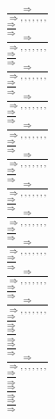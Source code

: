 \documentclass[11pt]{article}
\begin{document}
\begin{center}
\bigskip
\\$\frac{\Rightarrow }{\Rightarrow , , , , , , , }$
\bigskip
\\$\frac{\Rightarrow }{\Rightarrow }$
\bigskip
\\$\frac{\Rightarrow }{\Rightarrow , , , , , , , }$
\bigskip
\\$\frac{\Rightarrow }{\Rightarrow }$
\bigskip
\\$\frac{\Rightarrow }{\Rightarrow , , , , , , , }$
\bigskip
\\$\frac{\Rightarrow }{\Rightarrow }$
\bigskip
\\$\frac{\Rightarrow }{\Rightarrow , , , , , , , }$
\bigskip
\\$\frac{\Rightarrow }{\Rightarrow }$
\bigskip
\\$\frac{\Rightarrow }{\Rightarrow , , , , , , , }$
\bigskip
\\$\frac{\Rightarrow }{\Rightarrow }$
\bigskip
\\$\frac{\Rightarrow }{\Rightarrow , , , , , , , }$
\bigskip
\\$\frac{\Rightarrow }{\Rightarrow }$
\bigskip
\\$\frac{\Rightarrow }{\Rightarrow , , , , , , , }$
\bigskip
\\$\frac{\Rightarrow }{\Rightarrow }$
\bigskip
\\$\frac{\Rightarrow }{\Rightarrow , , , , , , , }$
\bigskip
\\$\frac{\Rightarrow }{\Rightarrow }$
\bigskip
\\$\frac{\Rightarrow }{\Rightarrow , , , , , , , }$
\bigskip
\\$\frac{\Rightarrow }{\Rightarrow }$
\bigskip
\\$\frac{\Rightarrow }{\Rightarrow , , , , , , , }$
\bigskip
\\$\frac{\Rightarrow }{\Rightarrow }$
\bigskip
\\$\frac{\Rightarrow }{\Rightarrow , , , , , , , }$
\bigskip
\\$\frac{\Rightarrow }{\Rightarrow }$
\bigskip
\\$\frac{\Rightarrow }{\Rightarrow }$
\bigskip
\\$\frac{\Rightarrow }{\Rightarrow }$
\bigskip
\\$\frac{\Rightarrow }{\Rightarrow , , , , , , , }$
\bigskip
\\$\frac{\Rightarrow }{\Rightarrow }$
\bigskip
\\$\frac{\Rightarrow }{\Rightarrow }$
\bigskip
\\$\frac{\Rightarrow }{\Rightarrow }$

\end{center}
\end{document}
